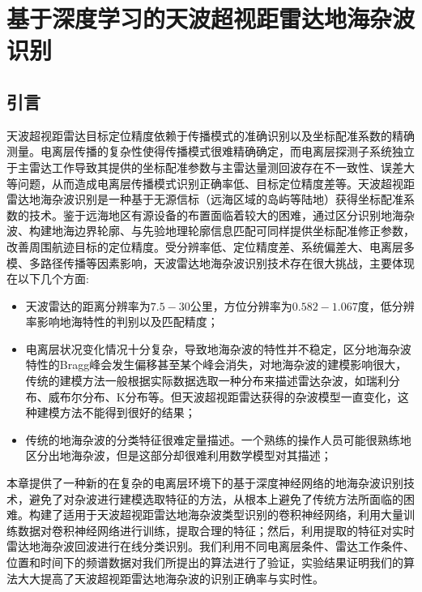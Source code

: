 \chapter{基于深度学习的天波超视距雷达地海杂波识别}
\section{引言}


天波超视距雷达目标定位精度依赖于传播模式的准确识别以及坐标配准系数的精确测量。电离层传播的复杂性使得传播模式很难精确确定，而电离层探测子系统独立于主雷达工作导致其提供的坐标配准参数与主雷达量测回波存在不一致性、误差大等问题，从而造成电离层传播模式识别正确率低、目标定位精度差等。天波超视距雷达地海杂波识别是一种基于无源信标（远海区域的岛屿等陆地）获得坐标配准系数的技术。鉴于远海地区有源设备的布置面临着较大的困难，通过区分识别地海杂波、构建地海边界轮廓、与先验地理轮廓信息匹配可同样提供坐标配准修正参数，改善周围航迹目标的定位精度。受分辨率低、定位精度差、系统偏差大、电离层多模、多路径传播等因素影响，天波雷达地海杂波识别技术存在很大挑战，主要体现在以下几个方面:
\begin{itemize}
	\item 天波雷达的距离分辨率为$7.5-30$公里，方位分辨率为$0.582-1.067$度，低分辨率影响地海特性的判别以及匹配精度；
	\item 电离层状况变化情况十分复杂，导致地海杂波的特性并不稳定，区分地海杂波特性的Bragg峰会发生偏移甚至某个峰会消失，对地海杂波的建模影响很大，传统的建模方法一般根据实际数据选取一种分布来描述雷达杂波，如瑞利分布、威布尔分布、K分布等。但天波超视距雷达获得的杂波模型一直变化，这种建模方法不能得到很好的结果；
	\item 传统的地海杂波的分类特征很难定量描述。一个熟练的操作人员可能很熟练地区分出地海杂波，但是这部分却很难利用数学模型对其描述；
\end{itemize}

本章提供了一种新的在复杂的电离层环境下的基于深度神经网络的地海杂波识别技术，避免了对杂波进行建模选取特征的方法，从根本上避免了传统方法所面临的困难。构建了适用于天波超视距雷达地海杂波类型识别的卷积神经网络，利用大量训练数据对卷积神经网络进行训练，提取合理的特征；然后，利用提取的特征对实时雷达地海杂波回波进行在线分类识别。我们利用不同电离层条件、雷达工作条件、位置和时间下的频谱数据对我们所提出的算法进行了验证，实验结果证明我们的算法大大提高了天波超视距雷达地海杂波的识别正确率与实时性。

